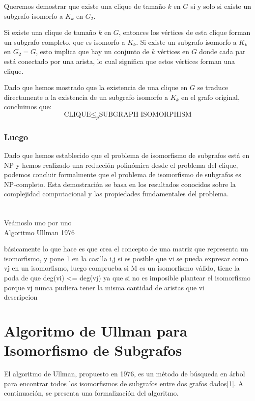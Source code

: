 \documentclass[12pt,a4paper]{article}
\begin{document}
Queremos demostrar que existe una clique de tamaño $k$ en $G$ si y solo si existe un subgrafo isomorfo a $K_k$ en $G_2$.

Si existe una clique de tamaño $k$ en $G$, entonces los vértices de esta clique forman un subgrafo completo, que es isomorfo a $K_k$.
Si existe un subgrafo isomorfo a $K_k$ en $G_2=G$, esto implica que hay un conjunto de $k$ vértices en $G$ donde cada par está conectado por una arista, lo cual significa que estos vértices forman una clique.

Dado que hemos mostrado que la existencia de una clique en $G$ se traduce directamente a la existencia de un subgrafo isomorfo a $K_k$ en el grafo original, concluimos que:
\[
    \text{CLIQUE} \leq_p \text{SUBGRAPH ISOMORPHISM}
\]

\subsubsection{Luego}
Dado que hemos establecido que el problema de isomorfismo de subgrafos está en NP y hemos realizado una reducción polinómica desde el problema del clique, podemos concluir formalmente que el problema de isomorfismo de subgrafos es NP-completo. Esta demostración se basa en los resultados conocidos sobre la complejidad computacional y las propiedades fundamentales del problema.\medspace
\\
\\
\\


Veámoslo uno por uno\\

Algoritmo Ullman 1976

básicamente lo que hace es que crea el concepto de una matriz que representa un isomorfismo, y pone 1 en la casilla i,j si es posible que vi  se pueda expresar como vj en un isomorfismo, luego comprueba si M es un isomorfismo válido, tiene la poda de que deg(vi) <= deg(vj) ya que si no es imposible plantear el isomorfismo porque vj nunca pudiera tener la misma cantidad de aristas que vi \\
descripcion
\\

\section{Algoritmo de Ullman para Isomorfismo de Subgrafos}

El algoritmo de Ullman, propuesto en 1976, es un método de búsqueda en árbol para encontrar todos los isomorfismos de subgrafos entre dos grafos dados[1]. A continuación, se presenta una formalización del algoritmo.
\end{document}
